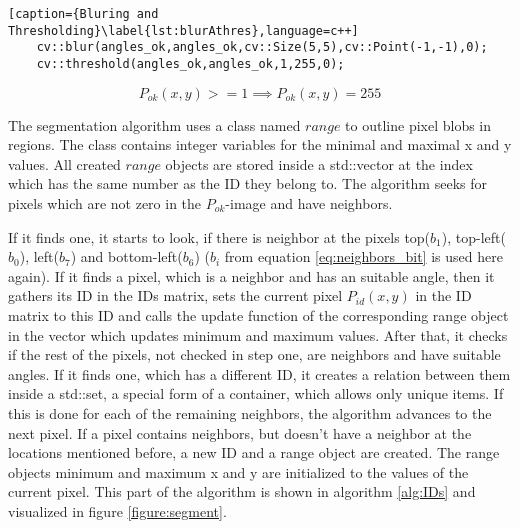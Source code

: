\begin{lstlisting}[caption={Bluring and Thresholding}\label{lst:blurAthres},language=c++]
	cv::blur(angles_ok,angles_ok,cv::Size(5,5),cv::Point(-1,-1),0);
	cv::threshold(angles_ok,angles_ok,1,255,0);
\end{lstlisting}

\begin{equation}
	P_{ok}(x,y)>=1 \implies P_{ok}(x,y)=255
	\label{eq:thresholdSeg}
\end{equation}


The segmentation algorithm uses a class named $range$ to outline pixel blobs in regions. The class contains integer 
variables for the minimal and maximal x and y values. All created $range$ objects are stored inside  
a std::vector at the index which has the same number as the ID they belong to. 
The algorithm seeks for pixels which are not zero in the $P_{ok}$-image and have neighbors.

If it finds one, it starts to look, if there is neighbor at the pixels top($b_1$), top-left($b_0$), 
left($b_7$) and bottom-left($b_6$) ($b_i$ from equation \vref{eq:neighbors_bit} is used here again).
If it finds a pixel, which is a neighbor and has an suitable angle, then it gathers its ID in the IDs matrix, 
sets the current pixel $P_{id}(x,y)$ in the ID matrix to this ID and calls the update function of the corresponding 
range object in the vector which updates minimum and maximum values. After that, it checks 
if the rest of the pixels, not checked in step one, are neighbors and have suitable angles. 
If it finds one, which has a different ID, it creates a relation between 
them inside a std::set, a special form of a container, which allows only unique items. 
If this is done for each of the remaining 
neighbors, the algorithm advances to the next pixel. If a pixel contains neighbors, but doesn't have a neighbor at the locations
mentioned before, a new ID and a range object are created. The range objects minimum and maximum x and y are initialized 
to the values of the current pixel. This part of the algorithm is shown in algorithm \vref{alg:IDs} 
and visualized in figure \vref{figure:segment}.

